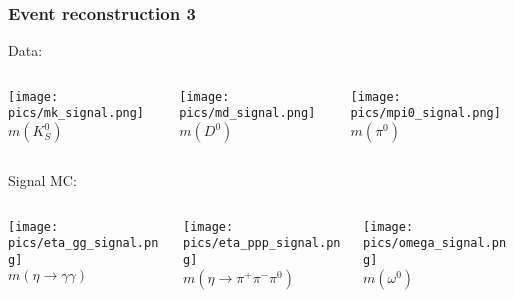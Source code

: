 \documentclass[10 pt,compress,mathserif]{beamer}
\newcommand{\etagg}{\ensuremath{\eta\to \gamma\gamma}\xspace}
\newcommand{\etappp}{\ensuremath{\eta\to \pi^+\pi^-\pi^0}\xspace}
\begin{document}
\begin{frame}
 \frametitle{Event reconstruction 3}
 \begin{small}
 Data:
 \begin{columns}
  \begin{column}{0.33\textwidth}
  \begin{center}
   \texttt{[image: pics/mk\_signal.png]}\\
   $m(K_S^0)$\\
  \end{center}
  \end{column}
  \begin{column}{0.33\textwidth}
  \begin{center}
   \texttt{[image: pics/md\_signal.png]}\\
   $m(D^0)$
  \end{center}
  \end{column}
  \begin{column}{0.33\textwidth}
   \begin{center}
    \texttt{[image: pics/mpi0\_signal.png]}\\
   $m(\pi^0)$\\
   \end{center}
  \end{column}
 \end{columns}
 \vspace{0.5 cm}
 Signal MC:
 \begin{columns}
  \begin{column}{0.33\textwidth}
  \begin{center}
   \texttt{[image: pics/eta\_gg\_signal.png]}\\
   $m(\etagg)$\\
  \end{center}
  \end{column}
  \begin{column}{0.33\textwidth}
  \begin{center}
   \texttt{[image: pics/eta\_ppp\_signal.png]}\\
   $m(\etappp)$\\
  \end{center}
  \end{column}
  \begin{column}{0.33\textwidth}
  \begin{center}
   \texttt{[image: pics/omega\_signal.png]}\\
   $m(\omega^0)$\\
  \end{center}
  \end{column}
 \end{columns}
 \end{small}
\end{frame}
\end{document}
